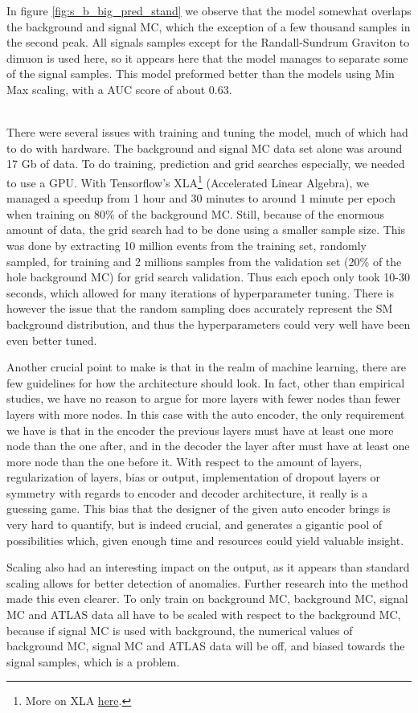 \documentclass[ reprint, amsmath,amssymb, aps, nofootinbib]{revtex4-2}
\begin{document}
In figure \ref{fig:s_b_big_pred_stand} we observe that the model somewhat overlaps the background and signal MC, which the exception of a few thousand samples in the second peak. All signals samples except for the Randall-Sundrum Graviton to dimuon is used here, so it appears here that the model manages to separate some of the signal samples. This model preformed better than the models using Min Max scaling, with a AUC score of about 0.63. \par 
\\ 
There were several issues with training and tuning the model, much of which had to do with hardware. The background and signal MC data set alone was around 17 Gb of data. To do training, prediction and grid searches especially, we needed to use a GPU. With Tensorflow's XLA\footnote{More on XLA \href{https://www.tensorflow.org/xla}{here}.} (Accelerated Linear Algebra), we managed a speedup from 1 hour and 30 minutes to around 1 minute per epoch when training on 80\% of the background MC. Still, because of the enormous amount of data, the grid search had to be done using a smaller sample size. This was done by extracting 10 million events from the training set, randomly sampled, for training and 2 millions samples from the validation set (20\% of the hole background MC) for grid search validation. Thus each epoch only took 10-30 seconds, which allowed for many iterations of hyperparameter tuning. There is however the issue that the random sampling does accurately represent the SM background distribution, and thus the hyperparameters could very well have been even better tuned. \par 
Another crucial point to make is that in the realm of machine learning, there are few guidelines for how the architecture should look. In fact, other than empirical studies, we have no reason to argue for more layers with fewer nodes than fewer layers with more nodes. In this case with the auto encoder, the only requirement we have is that in the encoder the previous layers must have at least one more node than the one after, and in the decoder the layer after must have at least one more node than the one before it. With respect to the amount of layers, regularization of layers, bias or output, implementation of dropout layers or symmetry with regards to encoder and decoder architecture, it really is a guessing game. This bias that the designer of the given auto encoder brings is very hard to quantify, but is indeed crucial, and generates a gigantic pool of possibilities which, given enough time and resources could yield valuable insight. \par 
Scaling also had an interesting impact on the output, as it appears than standard scaling allows for better detection of anomalies. Further research into the method made this even clearer. To only train on background MC, background MC, signal MC and ATLAS data all have to be scaled with respect to the background MC, because if signal MC is used with background, the numerical values of background MC, signal MC and ATLAS data will be off, and biased towards the signal samples, which is a problem. \par 
\end{document}
